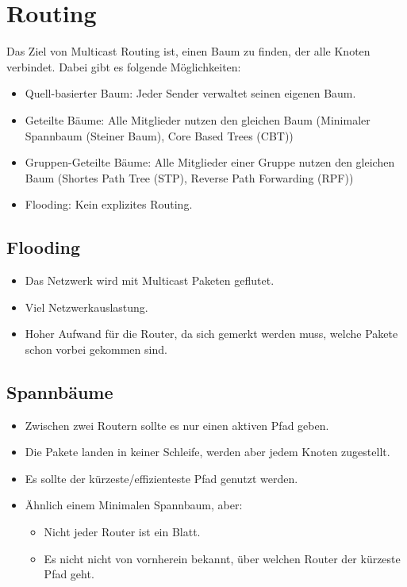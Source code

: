 	\section{Routing}
		Das Ziel von Multicast Routing ist, einen Baum zu finden, der alle Knoten verbindet. Dabei gibt es folgende Möglichkeiten:
		\begin{itemize}
			\item Quell-basierter Baum: Jeder Sender verwaltet seinen eigenen Baum.
			\item Geteilte Bäume: Alle Mitglieder nutzen den gleichen Baum (Minimaler Spannbaum (Steiner Baum), Core Based Trees (CBT))
			\item Gruppen-Geteilte Bäume: Alle Mitglieder einer Gruppe nutzen den gleichen Baum (Shortes Path Tree (STP), Reverse Path Forwarding (RPF))
			\item Flooding: Kein explizites Routing.
		\end{itemize}

		\subsection{Flooding}
			\begin{itemize}
				\item Das Netzwerk wird mit Multicast Paketen geflutet.
				\item Viel Netzwerkauslastung.
				\item Hoher Aufwand für die Router, da sich gemerkt werden muss, welche Pakete schon vorbei gekommen sind.
			\end{itemize}

		\subsection{Spannbäume}
			\begin{itemize}
				\item Zwischen zwei Routern sollte es nur einen aktiven Pfad geben.
				\item Die Pakete landen in keiner Schleife, werden aber jedem Knoten zugestellt.
				\item Es sollte der kürzeste/effizienteste Pfad genutzt werden.
				\item Ähnlich einem Minimalen Spannbaum, aber:
					\begin{itemize}
						\item Nicht jeder Router ist ein Blatt.
						\item Es nicht nicht von vornherein bekannt, über welchen Router der kürzeste Pfad geht.
					\end{itemize}
			\end{itemize}

